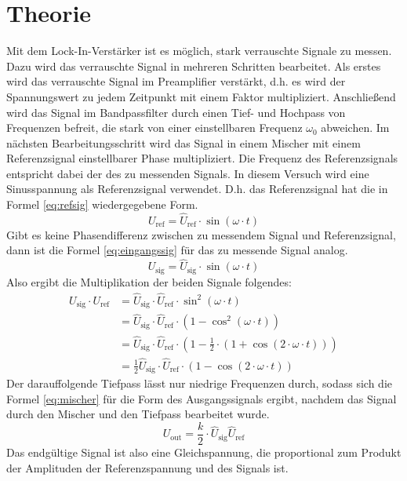 
\section{Theorie}
Mit dem Lock-In-Verstärker ist es möglich, stark verrauschte Signale zu
messen.  Dazu wird das verrauschte Signal in mehreren Schritten
bearbeitet. Als erstes wird das verrauschte Signal im Preamplifier
verstärkt, d.h. es wird der Spannungswert zu jedem Zeitpunkt mit einem
Faktor multipliziert. Anschließend wird das Signal im Bandpassfilter
durch einen Tief- und Hochpass von Frequenzen befreit, die stark von
einer einstellbaren Frequenz $\omega_0$ abweichen.  Im nächsten
Bearbeitungsschritt wird das Signal in einem Mischer mit einem
Referenzsignal einstellbarer Phase multipliziert. Die Frequenz des
Referenzsignals entspricht dabei der des zu messenden Signals.  In
diesem Versuch wird eine Sinusspannung als Referenzsignal
verwendet. D.h. das Referenzsignal hat die in Formel \eqref{eq:refsig}
wiedergegebene Form.
%
\begin{equation}
  \label{eq:refsig}
  U_\text{ref} = \widehat{U}_\text{ref} \cdot \sin(\omega \cdot t)
\end{equation}
%
Gibt es keine Phasendifferenz zwischen zu messendem Signal und
Referenzsignal, dann ist die Formel \eqref{eq:eingangssig} für das zu
messende Signal analog.
%
\begin{equation}
  \label{eq:eingangssig}
  U_\text{sig} = \widehat{U}_\text{sig} \cdot \sin(\omega \cdot t)
\end{equation}
%
Also ergibt die Multiplikation der beiden Signale folgendes:
%
\begin{equation*}
  \begin{split}
    U_\text{sig} \cdot U_\text{ref}
    &= \widehat{U}_\text{sig}\cdot \widehat{U}_\text{ref}\cdot
    \sin^2(\omega \cdot t) \\
    &= \widehat{U}_\text{sig} \cdot \widehat{U}_\text{ref}
    \cdot (1 - \cos^2(\omega \cdot t)) \\
    &= \widehat{U}_\text{sig} \cdot \widehat{U}_\text{ref} \cdot (1 -
    \frac{1}{2} \cdot (1 +
    \cos(2\cdot \omega \cdot t)))\\
    &= \frac{1}{2} \widehat{U}_\text{sig} \cdot \widehat{U}_\text{ref}
    \cdot(1 - \cos(2\cdot \omega\cdot t))
  \end{split}
\end{equation*}
%
Der darauffolgende Tiefpass lässt nur niedrige Frequenzen durch, sodass
sich die Formel \eqref{eq:mischer} für die Form des
Ausgangssignals ergibt, nachdem das Signal durch den Mischer und den
Tiefpass bearbeitet wurde.
%
\begin{equation}
  \label{eq:gleichspannung}
  U_\text{out} = \frac{k}{2} \cdot \widehat{U}_\text{sig} \widehat{U}_\text{ref}
\end{equation}
%
Das endgültige Signal ist also eine Gleichspannung, die proportional zum
Produkt der Amplituden der Referenzspannung und des Signals ist.

